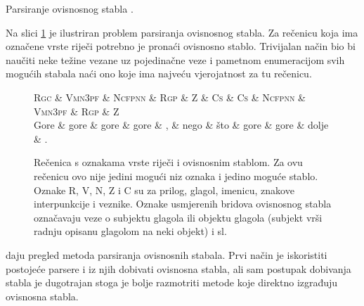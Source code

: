 Parsiranje ovisnosnog stabla  \citep{chang2015learning}.

Na slici \ref{fig:depparsing} je ilustriran problem parsiranja ovisnosnog
stabla. Za rečenicu koja ima označene vrste riječi potrebno je pronaći ovisnosno
stablo. Trivijalan način bio bi naučiti neke težine vezane uz pojedinačne veze i
pametnom enumeracijom svih mogućih stabala naći ono koje ima najveću
vjerojatnost za tu rečenicu.

\begin{figure}
\centering
\begin{dependency}[theme = simple]
\begin{deptext}
  \textsc{Rgc} \& \textsc{Vmn3pf} \& \textsc{Ncfpnn} \& \textsc{Rgp} \& \textsc{Z} \& \textsc{Cs} \& \textsc{Cs} \& \textsc{Ncfpnn} \& \textsc{Vmn3pf} \& \textsc{Rgp} \& \textsc{Z} \\
  Gore         \& gore            \& gore            \& gore         \& ,          \& nego        \& što         \& gore            \& gore            \& dolje        \& .          \\
\end{deptext}
\end{dependency}
\caption[Rečenica s oznakama vrste riječi i ovisnosnim stablom.]{Rečenica s
oznakama vrste riječi i ovisnosnim stablom. Za ovu rečenicu ovo nije jedini
mogući niz oznaka i jedino moguće stablo. Oznake R, V, N, Z i C su za prilog,
glagol, imenicu, znakove interpunkcije i veznike. Oznake usmjerenih bridova
ovisnosnog stabla označavaju veze o subjektu glagola ili objektu glagola
(subjekt vrši radnju opisanu glagolom na neki objekt) i sl.}
\label{fig:depparsing}
\end{figure}

\citet{cer2010parsing} daju pregled metoda parsiranja ovisnosnih stabala. Prvi
način je iskoristiti postojeće  parsere i iz njih dobivati
ovisnosna stabla, ali sam postupak dobivanja  stabla je
dugotrajan stoga je bolje razmotriti metode koje direktno izgrađuju ovisnosna
stabla.

